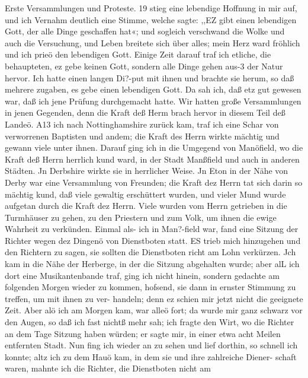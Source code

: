 Erste Versammlungen und Proteste. 19
stieg eine lebendige Hoffnung in mir auf, und ich Vernahm deutlich
eine Stimme, welche sagte: ,,EZ gibt einen lebendigen Gott, der
alle Dinge geschaffen hat«; und sogleich verschwand die Wolke
und auch die Versuchung, und Leben breitete sich über alles; mein
Herz ward fröhlich und ich prieö den lebendigen Gott. Einige
Zeit darauf traf ich etliche, die behaupteten, ez gebe keinen Gott,
sondern alle Dinge gehen aus-3 der Natur hervor. Ich hatte einen
langen Di?-put mit ihnen und brachte sie herum, so daß mehrere
zugaben, es gebe einen lebendigen Gott. Da sah ich, daß etz gut
gewesen war, daß ich jene Prüfung durchgemacht hatte. Wir
hatten große Versammlungen in jenen Gegenden, denn die Kraft
deß Herm brach hervor in diesem Teil deß Landeö. A13 ich nach
Nottinghamshire zurück kam, traf ich eine Schar von verworrenen
Baptisten und andem; die Kraft des Herrn wirkte mächtig und
gewann viele unter ihnen. Darauf ging ich in die Umgegend von
Manöfield, wo die Kraft deß Herrn herrlich kund ward, in der
Stadt Manßfield und auch in anderen Städten. Jn Derbshire
wirkte sie in herrlicher Weise. Jn Eton in der Nähe von Derby
war eine Versammlung von Freunden; die Kraft dez Herrn tat sich
darin so mächtig kund, daß viele gewaltig erschüttert wurden, und
vieler Mund wurde aufgetan durch die Kraft dez Herrn. Viele wurden
vom Herrn getrieben in die Turmhäuser zu gehen, zu den Priestern
und zum Volk, um ihnen die ewige Wahrheit zu verkünden.
Einmal als- ich in Man?-field war, fand eine Sitzung der
Richter wegen dez Dingenö von Dienstboten statt. ES trieb
mich hinzugehen und den Richtern zu sagen, sie sollten die
Dienstboten richt am Lohn verkürzen. Jch kam in die Nähe
der Herberge, in der die Sitzung abgehalten wurde; aber
alL ich dort eine Musikantenbande traf, ging ich nicht hinein,
sondern gedachte am folgenden Morgen wieder zu kommen, hofsend,
sie dann in ernster Stimmung zu treffen, um mit ihnen zu ver-
handeln; denn ez schien mir jetzt nicht die geeignete Zeit. Aber
alö ich am Morgen kam, war alleö fort; da wurde mir ganz
schwarz vor den Augen, so daß ich fast nichtß mehr sah; ich fragte
den Wirt, wo die Richter an dem Tage Sitzung haben würden;
er sagte mir, in einer etwa acht Meilen entfernten Stadt. Nun
fing ich wieder an zu sehen und lief dorthin, so schnell ich konnte;
altz ich zu dem Hauö kam, in dem sie und ihre zahlreiche Diener-
schaft waren, mahnte ich die Richter, die Dienstboten nicht am



